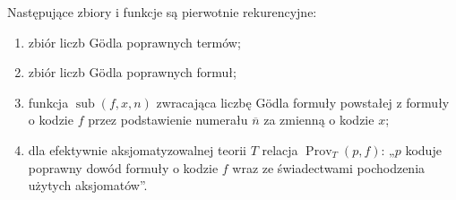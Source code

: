 \begin{lemat}\label{res:6:5}
Następujące zbiory i funkcje są pierwotnie rekurencyjne:
\begin{enumerate}[label=(\alph*)]
\item zbiór liczb Gödla poprawnych termów;
\item zbiór liczb Gödla poprawnych formuł;
\item funkcja $\operatorname{sub}(f,x,n)$ zwracająca liczbę Gödla formuły powstałej z formuły o kodzie $f$ przez podstawienie numerału $\overline n$ za zmienną o kodzie $x$;
\item dla efektywnie aksjomatyzowalnej teorii $T$ relacja $\operatorname{Prov}_T(p,f)$: „$p$ koduje poprawny dowód formuły o kodzie $f$ wraz ze świadectwami pochodzenia użytych aksjomatów”.
\end{enumerate}
\end{lemat}
